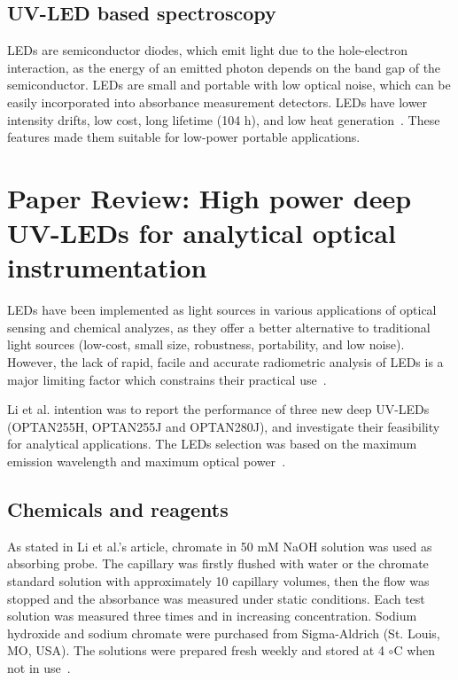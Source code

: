 \documentclass[11pt]{article}
\begin{document}
\subsection{UV-LED based spectroscopy}LEDs are semiconductor diodes, which emit light due to the hole-electron interaction, as the energy of an emitted photon depends on the band gap of the semiconductor. LEDs are small and portable with low optical noise, which can be easily incorporated into absorbance measurement detectors. LEDs have lower intensity drifts, low cost, long lifetime (104 h), and low heat generation\unskip~\cite{693772:16434827}. These features made them suitable for low-power portable applications.
    
\section{Paper Review: High power deep UV-LEDs for analytical optical instrumentation \unskip~\protect\cite{693772:16459460}}
LEDs have been implemented as light sources in various applications of optical sensing and chemical analyzes, as they offer a better alternative to traditional light sources (low-cost, small size, robustness, portability, and low noise). However, the lack of rapid, facile and accurate radiometric analysis of LEDs is a major limiting factor which constrains their practical use\unskip~\cite{693772:16434801}.

Li et al. intention was to report the performance of three new deep UV-LEDs (OPTAN255H, OPTAN255J and OPTAN280J), and investigate their feasibility for analytical applications. The LEDs selection was based on the maximum emission wavelength and maximum optical power\unskip~\cite{693772:16459460}.



\subsection{Chemicals and reagents}As stated in Li et al.'s article, chromate in 50 mM NaOH solution was used as absorbing probe. The capillary was firstly flushed with water or the chromate standard solution with approximately 10 capillary volumes, then the flow was stopped and the absorbance was measured under static conditions. Each test solution was measured three times and in increasing concentration. Sodium hydroxide and sodium chromate were purchased from Sigma-Aldrich (St. Louis, MO, USA). The solutions were prepared fresh weekly and stored at 4 \ensuremath{\circ }C when not in use\unskip~\cite{693772:16459460}.
\end{document}
